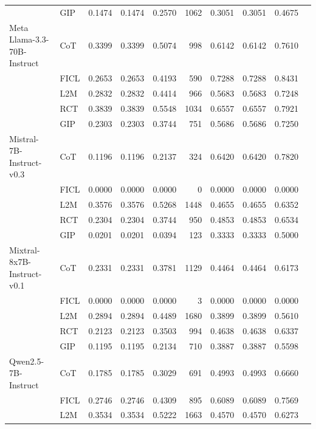 \documentclass[conference]{IEEEtran}
\begin{document}
\begin{longtable}{p{3.5cm} l r r r r r r r r}
                  & GIP  & 0.1474 & 0.1474 & 0.2570 & 1062 & 0.3051 & 0.3051 & 0.4675 \\ \addlinespace
Meta Llama-3.3-70B-Instruct & CoT  & 0.3399 & 0.3399 & 0.5074 & 998 & 0.6142 & 0.6142 & 0.7610 \\
                            & FICL & 0.2653 & 0.2653 & 0.4193 & 590 & 0.7288 & 0.7288 & 0.8431 \\
                            & L2M  & 0.2832 & 0.2832 & 0.4414 & 966 & 0.5683 & 0.5683 & 0.7248 \\
                            & RCT  & 0.3839 & 0.3839 & 0.5548 & 1034 & 0.6557 & 0.6557 & 0.7921 \\
                            & GIP  & 0.2303 & 0.2303 & 0.3744 & 751 & 0.5686 & 0.5686 & 0.7250 \\ \addlinespace
Mistral-7B-Instruct-v0.3 & CoT  & 0.1196 & 0.1196 & 0.2137 & 324 & 0.6420 & 0.6420 & 0.7820 \\
                         & FICL & 0.0000 & 0.0000 & 0.0000 & 0 & 0.0000 & 0.0000 & 0.0000 \\
                         & L2M  & 0.3576 & 0.3576 & 0.5268 & 1448 & 0.4655 & 0.4655 & 0.6352 \\
                         & RCT  & 0.2304 & 0.2304 & 0.3744 & 950 & 0.4853 & 0.4853 & 0.6534 \\
                         & GIP  & 0.0201 & 0.0201 & 0.0394 & 123 & 0.3333 & 0.3333 & 0.5000 \\ \addlinespace
Mixtral-8x7B-Instruct-v0.1 & CoT  & 0.2331 & 0.2331 & 0.3781 & 1129 & 0.4464 & 0.4464 & 0.6173 \\
                           & FICL & 0.0000 & 0.0000 & 0.0000 & 3 & 0.0000 & 0.0000 & 0.0000 \\
                           & L2M  & 0.2894 & 0.2894 & 0.4489 & 1680 & 0.3899 & 0.3899 & 0.5610 \\
                           & RCT  & 0.2123 & 0.2123 & 0.3503 & 994 & 0.4638 & 0.4638 & 0.6337 \\
                           & GIP  & 0.1195 & 0.1195 & 0.2134 & 710 & 0.3887 & 0.3887 & 0.5598 \\ \addlinespace
Qwen2.5-7B-Instruct & CoT  & 0.1785 & 0.1785 & 0.3029 & 691 & 0.4993 & 0.4993 & 0.6660 \\
                    & FICL & 0.2746 & 0.2746 & 0.4309 & 895 & 0.6089 & 0.6089 & 0.7569 \\
                    & L2M  & 0.3534 & 0.3534 & 0.5222 & 1663 & 0.4570 & 0.4570 & 0.6273 \\

\end{longtable}
\end{document}
